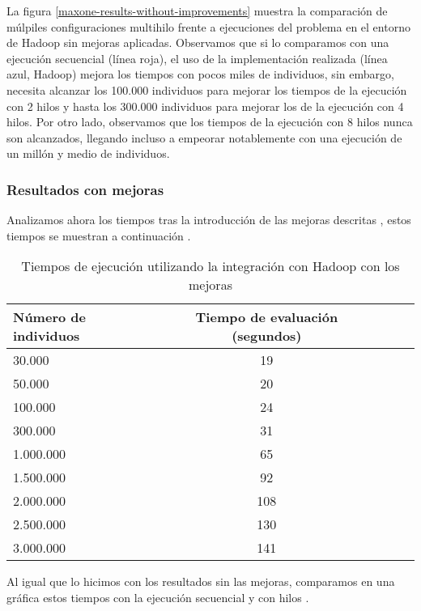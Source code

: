 La figura \ref{maxone-results-without-improvements} muestra la comparación de múlpiles configuraciones multihilo frente a ejecuciones del problema en el entorno de Hadoop sin mejoras aplicadas. Observamos que si lo comparamos con una ejecuci\'on secuencial (l\'inea roja), el uso de la implementaci\'on realizada (l\'inea azul, Hadoop) mejora los tiempos con pocos miles de individuos, sin embargo, necesita alcanzar los 100.000 individuos para mejorar los tiempos de la ejecución con 2 hilos y hasta los 300.000 individuos para mejorar los de la ejecución con 4 hilos. Por otro lado, observamos que los tiempos de la ejecución con 8 hilos nunca son alcanzados, llegando incluso a empeorar notablemente con una ejecución de un millón y medio de individuos.

 \subsubsection{Resultados con mejoras} \label{resultados-mejoras}

Analizamos ahora los tiempos tras la introducción de las mejoras descritas , estos tiempos se muestran a continuación .

\begin{table}[H]
  \begin{center}
    \begin{center}
    \begin{tabular}{l | c c c c}
    N\'umero de individuos & Tiempo de evaluaci\'on (segundos) \\ \hline
    30.000 & 19\\
    50.000 & 20\\
    100.000 & 24\\
    300.000 & 31\\
    1.000.000 & 65\\
    1.500.000 & 92\\
    2.000.000 & 108\\
    2.500.000 & 130\\
    3.000.000 & 141\\
    \end{tabular}
    \end{center}
    \caption{Tiempos de ejecuci\'on utilizando la integraci\'on con Hadoop con los mejoras}
    \label{tabla_tiempos_hadoop_con_mejoras}
  \end{center}
\end{table}

Al igual que lo hicimos con los resultados sin las mejoras, comparamos en una gráfica estos tiempos con la ejecución secuencial y con hilos .

